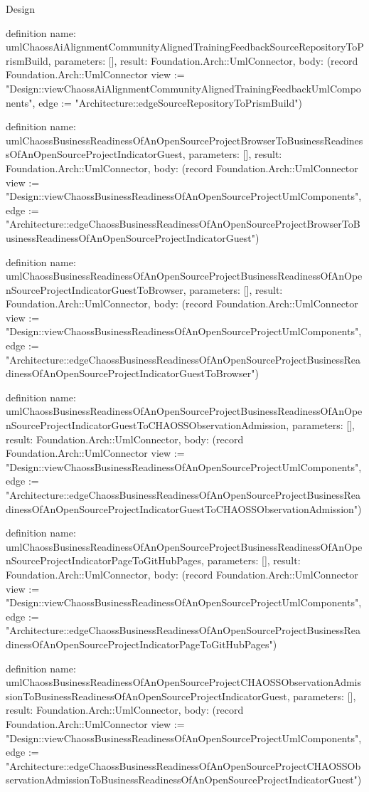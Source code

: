 \begin{lexlean}{Design}
\begin{semanticmodule}
definition{
  name: umlChaossAiAlignmentCommunityAlignedTrainingFeedbackSourceRepositoryToPrismBuild,
  parameters: [],
  result: Foundation.Arch::UmlConnector,
  body: (record Foundation.Arch::UmlConnector {view := "Design::viewChaossAiAlignmentCommunityAlignedTrainingFeedbackUmlComponents", edge := "Architecture::edgeSourceRepositoryToPrismBuild"})
}

definition{
  name: umlChaossBusinessReadinessOfAnOpenSourceProjectBrowserToBusinessReadinessOfAnOpenSourceProjectIndicatorGuest,
  parameters: [],
  result: Foundation.Arch::UmlConnector,
  body: (record Foundation.Arch::UmlConnector {view := "Design::viewChaossBusinessReadinessOfAnOpenSourceProjectUmlComponents", edge := "Architecture::edgeChaossBusinessReadinessOfAnOpenSourceProjectBrowserToBusinessReadinessOfAnOpenSourceProjectIndicatorGuest"})
}

definition{
  name: umlChaossBusinessReadinessOfAnOpenSourceProjectBusinessReadinessOfAnOpenSourceProjectIndicatorGuestToBrowser,
  parameters: [],
  result: Foundation.Arch::UmlConnector,
  body: (record Foundation.Arch::UmlConnector {view := "Design::viewChaossBusinessReadinessOfAnOpenSourceProjectUmlComponents", edge := "Architecture::edgeChaossBusinessReadinessOfAnOpenSourceProjectBusinessReadinessOfAnOpenSourceProjectIndicatorGuestToBrowser"})
}

definition{
  name: umlChaossBusinessReadinessOfAnOpenSourceProjectBusinessReadinessOfAnOpenSourceProjectIndicatorGuestToCHAOSSObservationAdmission,
  parameters: [],
  result: Foundation.Arch::UmlConnector,
  body: (record Foundation.Arch::UmlConnector {view := "Design::viewChaossBusinessReadinessOfAnOpenSourceProjectUmlComponents", edge := "Architecture::edgeChaossBusinessReadinessOfAnOpenSourceProjectBusinessReadinessOfAnOpenSourceProjectIndicatorGuestToCHAOSSObservationAdmission"})
}

definition{
  name: umlChaossBusinessReadinessOfAnOpenSourceProjectBusinessReadinessOfAnOpenSourceProjectIndicatorPageToGitHubPages,
  parameters: [],
  result: Foundation.Arch::UmlConnector,
  body: (record Foundation.Arch::UmlConnector {view := "Design::viewChaossBusinessReadinessOfAnOpenSourceProjectUmlComponents", edge := "Architecture::edgeChaossBusinessReadinessOfAnOpenSourceProjectBusinessReadinessOfAnOpenSourceProjectIndicatorPageToGitHubPages"})
}

definition{
  name: umlChaossBusinessReadinessOfAnOpenSourceProjectCHAOSSObservationAdmissionToBusinessReadinessOfAnOpenSourceProjectIndicatorGuest,
  parameters: [],
  result: Foundation.Arch::UmlConnector,
  body: (record Foundation.Arch::UmlConnector {view := "Design::viewChaossBusinessReadinessOfAnOpenSourceProjectUmlComponents", edge := "Architecture::edgeChaossBusinessReadinessOfAnOpenSourceProjectCHAOSSObservationAdmissionToBusinessReadinessOfAnOpenSourceProjectIndicatorGuest"})
}


\end{semanticmodule}
\end{lexlean}
